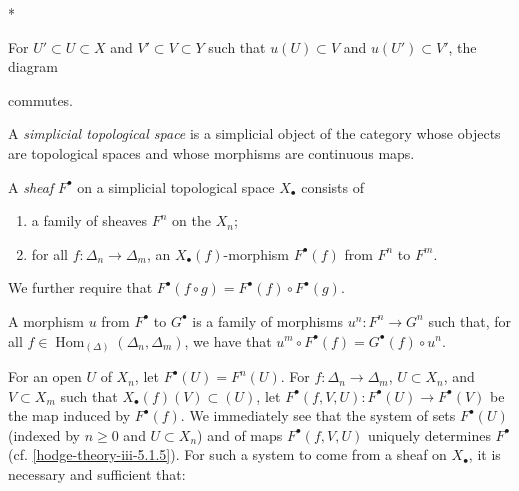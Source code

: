     \begin{condition}{*}\setnumber{*}\label{hodge-theory-iii-5.1.5.star}\skipsinglepar\par{}For \(U'\subset  U\subset  X\) and \(V'\subset  V\subset  Y\) such that \(u(U)\subset  V\) and \(u(U')\subset  V'\), the diagram
        

        commutes.\end{condition}\label{hodge-theory-iii-5.1.6}\par{}A \emph{simplicial topological space} is a simplicial object of the category whose objects are topological spaces and whose morphisms are continuous maps.\par{}A \emph{sheaf} \(F^\bullet \) on a simplicial topological space \(X_\bullet \) consists of

    
 \begin{enumerate}
      
 \item[(a)]
        a family of sheaves \(F^n\) on the \(X_n\);
      

      
 \item[(b)]
        for all \(f\colon \Delta _n\to \Delta _m\), an \(X_\bullet (f)\)-morphism \(F^\bullet (f)\) from \(F^n\) to \(F^m\).
      

    \end{enumerate}\par{}We further require that \(F^\bullet (f\circ  g)=F^\bullet (f)\circ  F^\bullet (g)\).\par{}A morphism \(u\) from \(F^\bullet \) to \(G^\bullet \) is a family of morphisms \(u^n\colon  F^n\to  G^n\) such that, for all \(f\in \operatorname {Hom}_{(\Delta )}(\Delta _n,\Delta _m)\), we have that \(u^m\circ  F^\bullet (f)=G^\bullet (f)\circ  u^n\).\label{hodge-theory-iii-5.1.7}\par{}For an open \(U\) of \(X_n\), let \(F^\bullet (U)=F^n(U)\).
    For \(f\colon \Delta _n\to \Delta _m\), \(U\subset  X_n\), and \(V\subset  X_m\) such that \(X_\bullet (f)(V)\subset (U)\), let \(F^\bullet (f,V,U)\colon  F^\bullet (U)\to  F^\bullet (V)\) be the map induced by \(F^\bullet (f)\).
    We immediately see that the system of sets \(F^\bullet (U)\) (indexed by \(n\geqslant 0\) and \(U\subset  X_n\)) and of maps \(F^\bullet (f,V,U)\) uniquely determines \(F^\bullet \) (cf. \cref{hodge-theory-iii-5.1.5}).
    For such a system to come from a sheaf on \(X_\bullet \), it is necessary and sufficient that:

